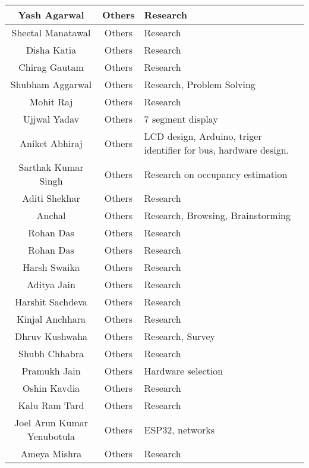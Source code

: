 \begin{center}
\begin{longtable}{ | c | c | m{6cm} | }
        \hline 
        Yash Agarwal & Others & Research\\ 
        \hline 
        Sheetal Manatawal & Others & Research\\ 
        \hline 
        Disha Katia & Others & Research\\ 
        \hline 
        Chirag Gautam & Others & Research\\ 
        \hline 
        Shubham Aggarwal & Others & Research, Problem Solving\\ 
        \hline 
        Mohit Raj & Others & Research\\ 
        \hline 
        Ujjwal Yadav & Others & 7 segment display\\ 
        \hline 
        Aniket Abhiraj & Others & LCD design, Arduino, triger identifier for bus, hardware design.\\ 
        \hline 
        Sarthak Kumar Singh & Others & Research on occupancy estimation\\ 
        \hline 
        Aditi Shekhar & Others & Research\\ 
        \hline 
        Anchal & Others & Research, Browsing, Brainstorming\\ 
        \hline 
        Rohan Das & Others & Research\\ 
        \hline 
        Rohan Das & Others & Research\\ 
        \hline 
        Harsh Swaika & Others & Research\\ 
        \hline 
        Aditya Jain & Others & Research\\ 
        \hline 
        Harshit Sachdeva & Others & Research\\ 
        \hline 
        Kinjal Anchhara & Others & Research\\ 
        \hline 
        Dhruv Kushwaha & Others & Research, Survey\\ 
        \hline 
        Shubh Chhabra & Others & Research\\ 
        \hline 
        Pramukh Jain & Others & Hardware selection\\ 
        \hline 
        Oshin Kavdia & Others & Research\\ 
        \hline 
        Kalu Ram Tard & Others & Research\\ 
        \hline 
        Joel Arun Kumar Yenubotula & Others & ESP32, networks\\ 
        \hline 
        Ameya Mishra & Others & Research\\ 
        \hline 

\end{longtable}
\end{center}
